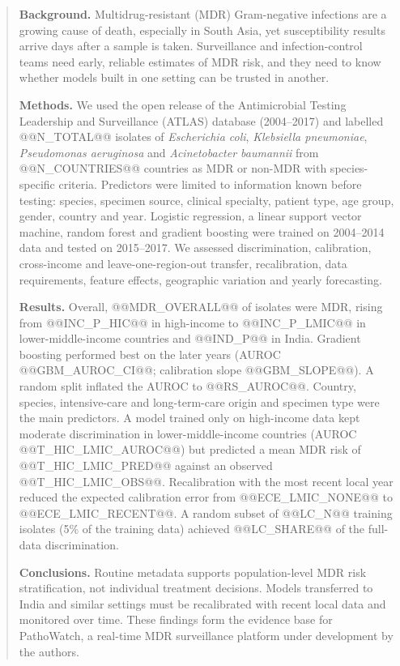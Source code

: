 \documentclass[11pt,a4paper]{article}
\newcommand{\sci}[1]{\textit{#1}}
\begin{document}
\begin{abstract}
\noindent\textbf{Background.} Multidrug-resistant (MDR) Gram-negative infections are a growing cause of death, especially in South Asia, yet susceptibility results arrive days after a sample is taken. Surveillance and infection-control teams need early, reliable estimates of MDR risk, and they need to know whether models built in one setting can be trusted in another.

\noindent\textbf{Methods.} We used the open release of the Antimicrobial Testing Leadership and Surveillance (ATLAS) database (2004--2017) and labelled @@N_TOTAL@@ isolates of \sci{Escherichia coli}, \sci{Klebsiella pneumoniae}, \sci{Pseudomonas aeruginosa} and \sci{Acinetobacter baumannii} from @@N_COUNTRIES@@ countries as MDR or non-MDR with species-specific criteria. Predictors were limited to information known before testing: species, specimen source, clinical specialty, patient type, age group, gender, country and year. Logistic regression, a linear support vector machine, random forest and gradient boosting were trained on 2004--2014 data and tested on 2015--2017. We assessed discrimination, calibration, cross-income and leave-one-region-out transfer, recalibration, data requirements, feature effects, geographic variation and yearly forecasting.

\noindent\textbf{Results.} Overall, @@MDR_OVERALL@@ of isolates were MDR, rising from @@INC_P_HIC@@ in high-income to @@INC_P_LMIC@@ in lower-middle-income countries and @@IND_P@@ in India. Gradient boosting performed best on the later years (AUROC @@GBM_AUROC_CI@@; calibration slope @@GBM_SLOPE@@). A random split inflated the AUROC to @@RS_AUROC@@. Country, species, intensive-care and long-term-care origin and specimen type were the main predictors. A model trained only on high-income data kept moderate discrimination in lower-middle-income countries (AUROC @@T_HIC_LMIC_AUROC@@) but predicted a mean MDR risk of @@T_HIC_LMIC_PRED@@ against an observed @@T_HIC_LMIC_OBS@@. Recalibration with the most recent local year reduced the expected calibration error from @@ECE_LMIC_NONE@@ to @@ECE_LMIC_RECENT@@. A random subset of @@LC_N@@ training isolates (5\% of the training data) achieved @@LC_SHARE@@ of the full-data discrimination.

\noindent\textbf{Conclusions.} Routine metadata supports population-level MDR risk stratification, not individual treatment decisions. Models transferred to India and similar settings must be recalibrated with recent local data and monitored over time. These findings form the evidence base for PathoWatch, a real-time MDR surveillance platform under development by the authors.
\end{abstract}
\end{document}
